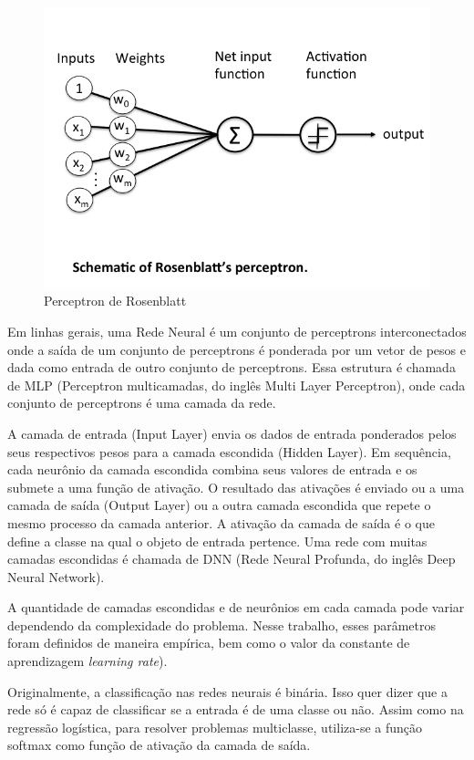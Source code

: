 \documentclass[conference]{IEEEtran}
\begin{document}
  \begin{figure}[!h]
      \centering
      \includegraphics[width=0.6\columnwidth]{images/perceptron.png}
      \caption{Perceptron de Rosenblatt}
      \label{fig1}
  \end{figure}
  
  Em linhas gerais, uma Rede Neural é um conjunto de perceptrons interconectados onde a saída de um conjunto de perceptrons é ponderada por um vetor de pesos e dada como entrada de outro conjunto de perceptrons. Essa estrutura é chamada de MLP (Perceptron multicamadas, do inglês Multi Layer Perceptron), onde cada conjunto de perceptrons é uma camada da rede.
  
  A camada de entrada (Input Layer) envia os dados de entrada ponderados pelos seus respectivos pesos para a camada escondida (Hidden Layer). Em sequência, cada neurônio da camada escondida combina seus valores de entrada e os submete a uma função de ativação. O resultado das ativações é enviado ou a uma camada de saída (Output Layer) ou a outra camada escondida que repete o mesmo processo da camada anterior. A ativação da camada de saída é o que define a classe na qual o objeto de entrada pertence. Uma rede com muitas camadas escondidas é chamada de DNN (Rede Neural Profunda, do inglês Deep Neural Network).
  
  A quantidade de camadas escondidas e de neurônios em cada camada pode variar dependendo da complexidade do problema. Nesse trabalho, esses parâmetros foram definidos de maneira empírica, bem como o valor da constante de aprendizagem \textit{learning rate}).
  
  Originalmente, a classificação nas redes neurais é binária. Isso quer dizer que a rede só é capaz de classificar se a entrada é de uma classe ou não. Assim como na regressão logística, para resolver problemas multiclasse, utiliza-se a função softmax como função de ativação da camada de saída.
  
\end{document}

